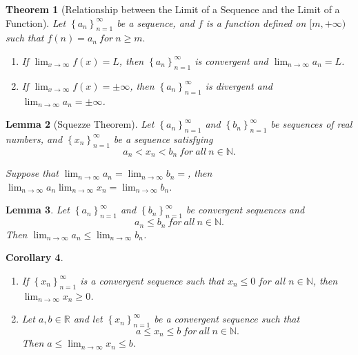 \documentclass{article}
\newtheorem{theorem}{Theorem}[section]
\newtheorem{lemma}[theorem]{Lemma}
\newtheorem{corollary}[theorem]{Corollary}
\theoremstyle{definition}
\begin{document}
\begin{theorem}[Relationship between the Limit of a Sequence and the Limit of a Function]
    Let $\left\{a_{n}\right\}_{n=1}^{\infty}$ be a sequence, and $f$ is a function defined on $[m,+\infty)$ such that $f(n)=a_{n}\ for\ n\geq m.$
    \begin{enumerate}
        \item If $\lim_{x\to\infty}f(x)=L$, then $\left\{a_{n}\right\}_{n=1}^{\infty}$ is convergent and $\lim_{n\rightarrow\infty}a_{n}=L$.
        \item If $\lim_{x\to\infty}f(x)=\pm \infty$, then $\left\{a_{n}\right\}_{n=1}^{\infty}$ is divergent and $\lim_{n\rightarrow\infty}a_{n}=\pm \infty$.
    \end{enumerate}
\end{theorem}


\begin{lemma}[Squezze Theorem]

    Let $\left\{a_{n}\right\}_{n=1}^{\infty}$ and $\left\{b_{n}\right\}_{n=1}^{\infty}$ be sequences of real numbers, and $\left\{x_{n}\right\}_{n=1}^{\infty}$
     be a sequence satisfying 
     $$a_{n}<x_{n}<b_{n}\ for\ all\ n\in\mathbb{N}.$$

    Suppose that $\lim_{n\rightarrow\infty}a_{n}=\lim_{n\rightarrow\infty}b_{n}=$,
    then $\lim_{n\rightarrow\infty}a_{n}\lim_{n\rightarrow\infty}x_{n}=\lim_{n\rightarrow\infty}b_{n}$.
    
\end{lemma}

\begin{lemma}
    
    Let $\left\{a_{n}\right\}_{n=1}^{\infty}$ and $\left\{b_{n}\right\}_{n=1}^{\infty}$ be convergent sequences and 
    $$a_{n}\leq b_{n}\ for\ all\ n\in \mathbb{N}.$$
    Then $\lim_{n\rightarrow\infty}a_{n}\leq \lim_{n\rightarrow\infty}b_{n}$.
\end{lemma}

\begin{corollary}
    \begin{enumerate}
        \item If $\left\{x_{n}\right\}_{n=1}^{\infty}$ is a convergent sequence such that $x_{n}\leq 0$ for all $n\in \mathbb{N}$, then $\lim_{n\to\infty}x_{n}\geq0$.
        \item Let $a,b\in\mathbb{R}$ and let $\left\{x_{n}\right\}_{n=1}^{\infty}$ be a convergent sequence such that 
        $$a\leq x_{n}\leq b\ for\ all\ n\in \mathbb{N}.$$
        Then $a\leq \lim_{n\rightarrow\infty}x_{n}\leq b$.
    \end{enumerate}
\end{corollary}
\end{document}
